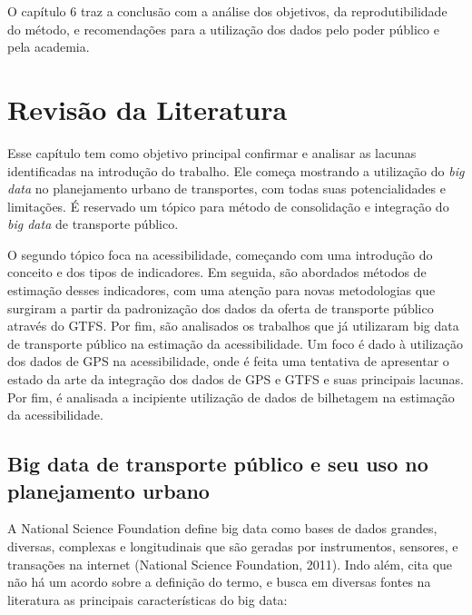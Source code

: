 \documentclass[        
    a4paper,          %
    12pt,             %
    chapter=TITLE,    %
    section=Title,    %
    subsection=Title, %
    oneside,          %
    english,          %
    spanish,          %
    brazil,           %
    fleqn             %
]{abntex2}
\begin{document}
  O capítulo 6 traz a conclusão com a análise dos objetivos, da reprodutibilidade do método, e recomendações para a utilização dos dados pelo poder público e pela academia.
  
  \hypertarget{revisao-da-literatura}{%
  \chapter{Revisão da Literatura}\label{revisao-da-literatura}}
  
  Esse capítulo tem como objetivo principal confirmar e analisar as lacunas identificadas na introdução do trabalho. Ele começa mostrando a utilização do \emph{big data} no planejamento urbano de transportes, com todas suas potencialidades e limitações. É reservado um tópico para método de consolidação e integração do \emph{big data} de transporte público.
  
  O segundo tópico foca na acessibilidade, começando com uma introdução do conceito e dos tipos de indicadores. Em seguida, são abordados métodos de estimação desses indicadores, com uma atenção para novas metodologias que surgiram a partir da padronização dos dados da oferta de transporte público através do GTFS. Por fim, são analisados os trabalhos que já utilizaram big data de transporte público na estimação da acessibilidade. Um foco é dado à utilização dos dados de GPS na acessibilidade, onde é feita uma tentativa de apresentar o estado da arte da integração dos dados de GPS e GTFS e suas principais lacunas. Por fim, é analisada a incipiente utilização de dados de bilhetagem na estimação da acessibilidade.
  
  \hypertarget{big-data-de-transporte-publico-e-seu-uso-no-planejamento-urbano}{%
  \section{Big data de transporte público e seu uso no planejamento urbano}\label{big-data-de-transporte-publico-e-seu-uso-no-planejamento-urbano}}
  
  A National Science Foundation define big data como bases de dados grandes, diversas, complexas e longitudinais que são geradas por instrumentos, sensores, e transações na internet (National Science Foundation, 2011). Indo além, \citet{Kitchin2013} cita que não há um acordo sobre a definição do termo, e busca em diversas fontes na literatura as principais características do big data:
  
\end{document}
